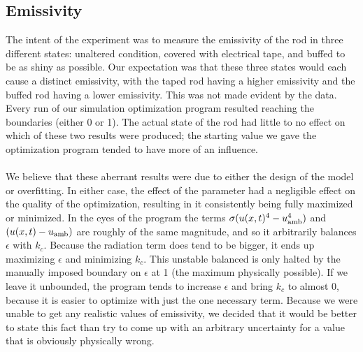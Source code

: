 \documentclass[letterpaper,titlepage,oneside]{report}
\begin{document}
\subsection*{Emissivity}
\label{sec:emiss}
The intent of the experiment was to measure the emissivity of the
rod in three different states: unaltered condition,
covered with electrical tape, and buffed to be as shiny as possible.
Our expectation was that these three states would each cause
a distinct emissivity, with the taped rod having a higher
emissivity and the buffed rod having a lower emissivity.
This was not made evident by the data. Every run of our
simulation optimization program resulted reaching the boundaries
(either 0 or 1). The actual state of the rod had little to no
effect on which of these two results were produced;
the starting value we gave the optimization program tended to have
more of an influence.
\\\\
We believe that these aberrant results were due to either the design
of the model or overfitting. In either case, the effect of the
parameter had a negligible effect on the quality of the optimization,
resulting in it consistently being fully maximized or minimized.
In the eyes of the program the terms $\sigma(u(x,t)^4-u_{\rm{amb}}^4)$
and $(u(x,t)-u_{\rm{amb}})$ are roughly of the same magnitude,
and so it arbitrarily balances $\epsilon$ with $k_c$. Because the
radiation term does tend to be bigger, it ends up 
maximizing $\epsilon$ and minimizing $k_c$. This unstable balanced is only
halted by the manually imposed boundary on $\epsilon$ at 1
(the maximum physically possible). If we leave it unbounded,
the program tends to increase $\epsilon$ and bring $k_c$ to almost 0,
because it is easier to optimize with just the one necessary term.
Because we were unable to get any realistic values of emissivity,
we decided that it would be better to state this fact than try to
come up with an arbitrary uncertainty for a value that is
obviously physically wrong.
\end{document}
